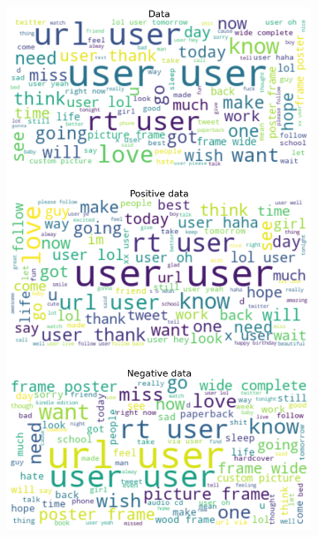 \documentclass{article}
\begin{document}
\begin{itemize}
  \begin{figure}[H]
    \centering
    \captionsetup{justification=centering}
    \begin{subfigure}[b]{0.24\textwidth}
      \centering
      \includegraphics[width=\textwidth]{chapter-06/section-01-01/15/visualization/1/wordcloud.png}
    \end{subfigure}
    \begin{subfigure}[b]{0.24\textwidth}
      \centering

\end{subfigure}
\end{figure}
\end{itemize}
\end{document}
